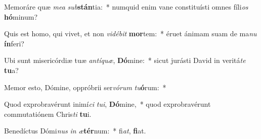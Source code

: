 \item Memoráre quæ \textit{me}\textit{a} \textit{sub}\textbf{stán}tia:~* numquid enim vane constituísti omnes fíli\textit{os} \textbf{hó}minum?
\item Quis est homo, qui vivet, et non \textit{vi}\textit{dé}\textit{bit} \textbf{mor}tem:~* éruet ánimam suam de ma\textit{nu} \textbf{ín}feri?
\item Ubi sunt misericórdiæ tuæ \textit{an}\textit{tí}\textit{quæ}, \textbf{Dó}mine:~* sicut jurásti David in veritá\textit{te} \textbf{tu}a?
\item Memor esto, Dómine, oppróbrii ser\textit{vó}\textit{rum} \textit{tu}\textbf{ó}rum:~* 
\item Quod exprobravérunt inimí\textit{ci} \textit{tu}\textit{i}, \textbf{Dó}mine,~* quod exprobravérunt commutatiónem Chris\textit{ti} \textbf{tu}i.
\item Benedíctus Dómi\textit{nus} \textit{in} \textit{æ}\textbf{tér}num:~* fi\textit{at}, \textbf{fi}at.
